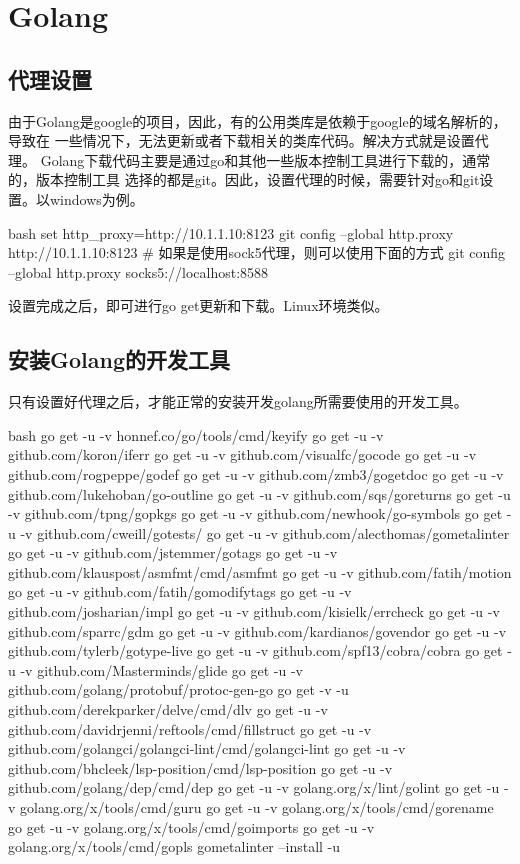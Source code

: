 \chapter{Golang}

\section{代理设置}
由于Golang是google的项目，因此，有的公用类库是依赖于google的域名解析的，导致在
一些情况下，无法更新或者下载相关的类库代码。解决方式就是设置代理。
Golang下载代码主要是通过go和其他一些版本控制工具进行下载的，通常的，版本控制工具
选择的都是git。因此，设置代理的时候，需要针对go和git设置。以windows为例。
\begin{code-block}{bash}
set http_proxy=http://10.1.1.10:8123
git config --global http.proxy http://10.1.1.10:8123
# 如果是使用sock5代理，则可以使用下面的方式
git config --global http.proxy socks5://localhost:8588
\end{code-block}

设置完成之后，即可进行go get更新和下载。Linux环境类似。

\section{安装Golang的开发工具}
只有设置好代理之后，才能正常的安装开发golang所需要使用的开发工具。
\begin{code-block}{bash}
go get -u -v honnef.co/go/tools/cmd/keyify
go get -u -v github.com/koron/iferr
go get -u -v github.com/visualfc/gocode
go get -u -v github.com/rogpeppe/godef
go get -u -v github.com/zmb3/gogetdoc
go get -u -v github.com/lukehoban/go-outline
go get -u -v github.com/sqs/goreturns
go get -u -v github.com/tpng/gopkgs
go get -u -v github.com/newhook/go-symbols
go get -u -v github.com/cweill/gotests/
go get -u -v github.com/alecthomas/gometalinter
go get -u -v github.com/jstemmer/gotags
go get -u -v github.com/klauspost/asmfmt/cmd/asmfmt
go get -u -v github.com/fatih/motion
go get -u -v github.com/fatih/gomodifytags
go get -u -v github.com/josharian/impl
go get -u -v github.com/kisielk/errcheck
go get -u -v github.com/sparrc/gdm
go get -u -v github.com/kardianos/govendor
go get -u -v github.com/tylerb/gotype-live
go get -u -v github.com/spf13/cobra/cobra
go get -u -v github.com/Masterminds/glide
go get -u -v github.com/golang/protobuf/protoc-gen-go
go get -v -u github.com/derekparker/delve/cmd/dlv
go get -u -v github.com/davidrjenni/reftools/cmd/fillstruct
go get -u -v github.com/golangci/golangci-lint/cmd/golangci-lint
go get -u -v github.com/bhcleek/lsp-position/cmd/lsp-position
go get -u -v github.com/golang/dep/cmd/dep
go get -u -v golang.org/x/lint/golint
go get -u -v golang.org/x/tools/cmd/guru
go get -u -v golang.org/x/tools/cmd/gorename
go get -u -v golang.org/x/tools/cmd/goimports
go get -u -v golang.org/x/tools/cmd/gopls
gometalinter --install -u
\end{code-block}

